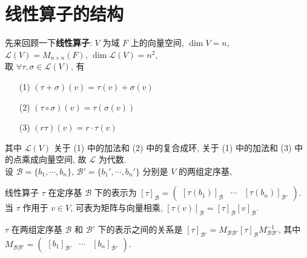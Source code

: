 \documentclass{note}
\begin{document}
\fi
\chapter{线性算子的结构}
先来回顾一下\textbf{线性算子}: $V$ 为域 $F$ 上的向量空间, $\dim V=n$, $\mathcal{L}(V)=M_{n\times n}(F)$, $\dim\mathcal{L}(V)=n^2$,\\
取 $\forall\tau,\sigma\in\mathcal{L}(V)$, 有
\begin{itemize}
    \item[(1)] $(\tau+\sigma)(v)=\tau(v)+\sigma(v)$
    \item[(2)] $(\tau\circ\sigma)(v)=\tau(\sigma(v))$
    \item[(3)] $(r\tau)(v)=r\cdot\tau(v)$
\end{itemize}
其中 $\mathcal{L}(V)$ 关于 (1) 中的加法和 (2) 中的复合成环, 关于 (1) 中的加法和 (3) 中的点乘成向量空间, 故 $\mathcal{L}$ 为代数.\\
设 $\mathcal{B}=\{b_1,\cdots,b_n\}$, $\mathcal{B}'=\{b_1',\cdots,b_n'\}$ 分别是 $V$ 的两组定序基,
\begin{center}
\end{center}

\begin{thm}[(课本定理 7.1)]
    线性算子 $\tau$ 在定序基 $\mathcal{B}$ 下的表示为 $[\tau]_{\mathcal{B}}=\begin{pmatrix}
        [\tau(b_1)]_{\mathcal{B}}&\cdots&[\tau(b_n)]_{\mathcal{B}'}
    \end{pmatrix}$.\\
    当 $\tau$ 作用于 $v\in V$, 可表为矩阵与向量相乘, $[\tau(v)]_{\mathcal{B}}=[\tau]_{\mathcal{B}}[v]_{\mathcal{B}}$.
\end{thm}

\begin{thm}[(课本定理 7.2)]
    $\tau$ 在两组定序基 $\mathcal{B}$ 和 $\mathcal{B}'$ 下的表示之间的关系是 $[\tau]_{\mathcal{B}'}=M_{\mathcal{BB}'}[\tau]_{\mathcal{B}}M_{\mathcal{BB}'}^{-1}$, 其中 $M_{\mathcal{BB}'}=\begin{pmatrix}
        [b_1]_{\mathcal{B}'}&\cdots&[b_n]_{\mathcal{B}'}
    \end{pmatrix}$.
\end{thm}
\end{document}
